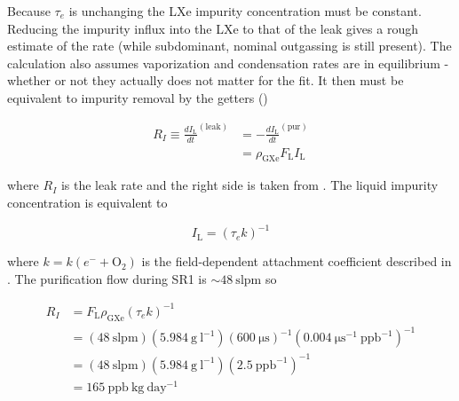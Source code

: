Because $\tau_e$ is unchanging the LXe impurity concentration must be constant.  Reducing the impurity influx into the LXe to that of the
leak
gives a rough estimate of the rate (while subdominant, nominal outgassing is still present).  The calculation also
assumes vaporization and condensation rates are in equilibrium - whether or not they actually does not matter for the fit.  It then must
be equivalent to impurity removal by the getters ()

\begin{equation}
\begin{aligned}
R_I \equiv \frac{dI_{\mathrm{L}}}{dt}^{(\mathrm{leak})} &= -\frac{dI_{\mathrm{L}}}{dt}^{(\mathrm{pur})}
\\
&= \rho_{\mathrm{GXe}} F_{\mathrm{L}} I_{\mathrm{L}}
\end{aligned}
\end{equation}

\noindent where $R_I$ is the leak rate and the right side is taken from .  The liquid
impurity concentration is equivalent to

\vspace{-10pt}

\begin{equation}
I_{\mathrm{L}} = ( \tau_e k)^{-1}
\end{equation}

\noindent where $k = k(e^- + \mathrm{O_2})$ is the field-dependent \electron attachment coefficient described in
.  The purification flow during SR1 is ${\sim} 48\ \mathrm{slpm}$ so

\vspace{-10pt}

\begin{equation}
\begin{aligned}
R_I &= F_{\mathrm{L}} \rho_{\mathrm{GXe}} (\tau_e k)^{-1} \\[2pt]
&= (48\ \mathrm{slpm}) (5.984\ \mathrm{g\ l^{-1}}) (600\ \mathrm{\mu s})^{-1} (0.004\ \mathrm{\mu s^{-1}\ ppb^{-1}})^{-1} \\[2pt]
&= (48\ \mathrm{slpm}) (5.984\ \mathrm{g\ l^{-1}}) (2.5\ \mathrm{ppb^{-1}})^{-1} \\[2pt]
&= 165\ \mathrm{ppb\ kg\ day^{-1}}
\label{eq:electron_lifetime_model_outgassing_leak}
\end{aligned}
\end{equation}


